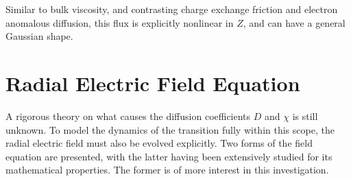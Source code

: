 Similar to bulk viscosity, and contrasting charge exchange friction and electron anomalous diffusion, this flux is explicitly nonlinear in $Z$, and can have a general Gaussian shape.


\section{Radial Electric Field Equation}\label{sec:Z_equation}
A rigorous theory on what causes the diffusion coefficients $D$ and $\chi$ is still unknown.
To model the dynamics of the transition fully within this scope, the radial electric field must also be evolved explicitly.
Two forms of the field equation are presented, with the latter having been extensively studied for its mathematical properties.
The former is of more interest in this investigation.

